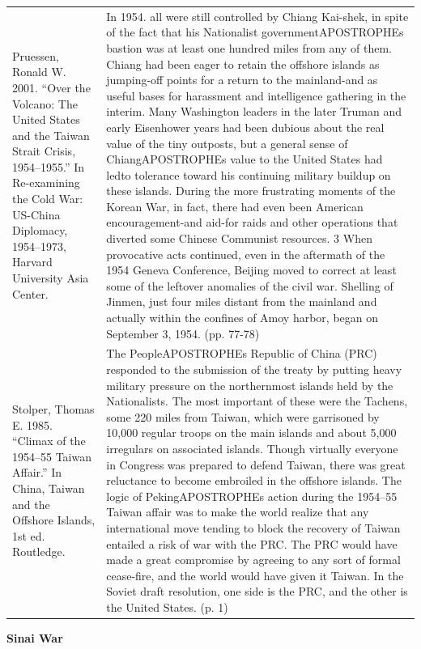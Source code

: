{\begin{longtable}{p{}p{}}
\\
Pruessen, Ronald W. 2001. “Over the Volcano: The United States and the Taiwan Strait Crisis, 1954–1955.” In Re-examining the Cold War: US-China Diplomacy, 1954–1973, Harvard University Asia Center. & In 1954. all were still controlled by Chiang Kai-shek, in spite of the fact that his Nationalist governmentAPOSTROPHEs bastion was at least one hundred miles from any of them. Chiang had been eager to retain the offshore islands as jumping-off points for a return to the mainland-and as useful bases for harassment and intelligence gathering in the interim. Many Washington leaders in the later Truman and early Eisenhower years had been dubious about the real value of the tiny outposts, but a general sense of ChiangAPOSTROPHEs value to the United States had ledto tolerance toward his continuing military buildup on these islands. During the more frustrating moments of the Korean War, in fact, there had even been American encouragement-and aid-for raids and other operations that diverted some Chinese Communist resources. 3 When provocative acts continued, even in the aftermath of the 1954 Geneva Conference, Beijing moved to correct at least some of the leftover anomalies of the civil war. Shelling of Jinmen, just four miles distant from the mainland and actually within the confines of Amoy harbor, began on September 3, 1954. (pp. 77-78)
\\
Stolper, Thomas E. 1985. “Climax of the 1954–55 Taiwan Affair.” In China, Taiwan and the Offshore Islands, 1st ed. Routledge. & The PeopleAPOSTROPHEs Republic of China (PRC) responded to the submission of the treaty by putting heavy military pressure on the northernmost islands held by the Nationalists. The most important of these were the Tachens, some 220 miles from Taiwan, which were garrisoned by 10,000 regular troops on the main islands and about 5,000 irregulars on associated islands. Though virtually everyone in Congress was prepared to defend Taiwan, there was great reluctance to become embroiled in the offshore islands. The logic of PekingAPOSTROPHEs action during the 1954–55 Taiwan affair was to make the world realize that any international move tending to block the recovery of Taiwan entailed a risk of war with the PRC. The PRC would have made a great compromise by agreeing to any sort of formal cease-fire, and the world would have given it Taiwan. In the Soviet draft resolution, one side is the PRC, and the other is the United States.  (p. 1)
\\
\end{longtable}}
\clearpage
         \textbf{Sinai War} 

